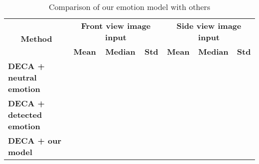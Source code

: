 \begin{table}[H]
    \centering
    \captionsetup{font=bf}
    \caption{Comparison of our emotion model with others}
    \begin{tabular}{|l|ccc|ccc|}
        \hline
        \multicolumn{1}{|c|}{\multirow{2}{*}{\textbf{Method}}} & \multicolumn{3}{c|}{\textbf{Front view image input}} & \multicolumn{3}{c|}{\textbf{Side view image input}}                                                                                                           \\ \cline{2-7}
        \multicolumn{1}{|c|}{}                                 & \multicolumn{1}{c|}{\textbf{Mean}}                   & \multicolumn{1}{c|}{\textbf{Median}}                & \textbf{Std} & \multicolumn{1}{c|}{\textbf{Mean}} & \multicolumn{1}{c|}{\textbf{Median}} & \textbf{Std} \\ \hline
        \textbf{DECA + neutral emotion}                        & \multicolumn{1}{c|}{}                                & \multicolumn{1}{c|}{}                               &              & \multicolumn{1}{c|}{}              & \multicolumn{1}{c|}{}                &              \\ \hline
        \textbf{DECA + detected emotion}                       & \multicolumn{1}{c|}{}                                & \multicolumn{1}{c|}{}                               &              & \multicolumn{1}{c|}{}              & \multicolumn{1}{c|}{}                &              \\ \hline
        \textbf{DECA + our model}                              & \multicolumn{1}{c|}{}                                & \multicolumn{1}{c|}{}                               &              & \multicolumn{1}{c|}{}              & \multicolumn{1}{c|}{}                &              \\ \hline
    \end{tabular}
    \label{now_results}
\end{table}

